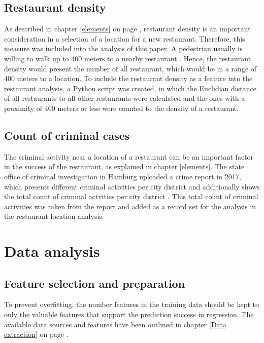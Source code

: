 \documentclass[a4paper, 11pt, oneside]{Thesis}  %
\begin{document}
\section{Restaurant density}
\label{restaurant_density}

As described in chapter \ref{elements} on page \pageref{elements}, restaurant density is an important consideration in a selection of a location for a new restaurant. Therefore, this measure was included into the analysis of this paper. A pedestrian usually is willing to walk up to 400 meters to a nearby restaurant \cite{Yang.2012b}. Hence, the restaurant density would present the number of all restaurant, which would be in a range of 400 meters to a location. To include the restaurant density as a feature into the restaurant analysis, a Python script was created, in which the Euclidian distance of all  restaurants to all other restaurants were calculated and the ones with a proximity of 400 meters or less were counted to the density of a restaurant.

\section{Count of criminal cases}
\label{criminal_count}

The criminal activity near a location of a restaurant can be an important factor in the success of the restaurant, as explained in chapter \ref{elements}. The state office of criminal investigation in Hamburg uploaded a crime report in 2017, which presents different criminal activities per city district and additionally shows the total count of criminal actvities per city district \cite{LandeskriminalamtHamburg.2017}. This total count of criminal activities was taken from the report and added as a record set for the analysis in the restaurant location analysis.

\chapter{Data analysis}

\section{Feature selection and preparation}

To prevent overfitting, the number features in the training data should be kept to only the valuable features that support the prediction success in regression. The available data sources and features have been outlined in chapter \ref{Data extraction} on page \pageref{Data extraction}. 
\end{document}
